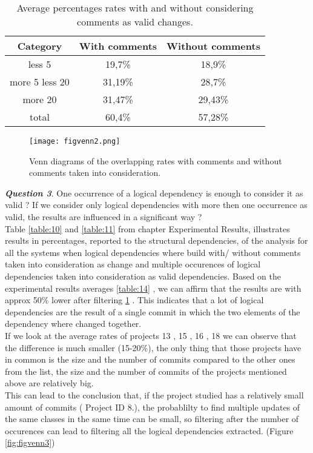 \begin{table}
  \centering
  \begin{tabular}{@{}c||cc@{}}
    \toprule
       Category & With comments & Without comments  \\
    \midrule
less 5	&	19,7\% &	18,9\%	\\
more 5 less 20	&	31,19\% &	28,7\%\\
more 20	&	31,47\%	&	29,43\%\\
total & 60,4\% &57,28\% \\
    \bottomrule
  \end{tabular}
  \caption{Average percentages rates with and without considering comments as valid changes.}
   \label{table:comm}
\end{table}

\begin{figure}[h]
\centering
\texttt{[image: figvenn2.png]}
\caption{Venn diagrams of the overlapping rates with comments and without comments taken into consideration.}
\label{fig:figvenn2}
\end{figure}



\textit{\textbf{Question 3}}. One occurrence of a logical dependency is enough to consider it as valid ? If we consider only logical dependencies with more then one occurrence as valid, the results are influenced in a significant way ?\\

\tab Table \ref{table:10} and \ref{table:11} from chapter Experimental Results,  illustrates results in percentages, reported to the structural dependencies, of the analysis for all the systems when logical dependencies where build with/ without comments taken into consideration as change and multiple occurences of logical dependencies taken into consideration as valid dependencies. Based on the experimental results averages \ref{table:14} , we can affirm that the results are with approx 50\% lower after filtering \ref{table:comm} . This indicates that a lot of logical dependencies are the result of a single commit in which the two elements of the dependency where changed together. \\ If we look at the average rates of projects 13 , 15 , 16 , 18 we can observe that the difference is much smaller (15-20\%), the only thing that those projects have in common is the size and the number of commits compared to the other ones from the list, the size and the number of commits of the projects mentioned above are relatively big. \\ This can lead to the conclusion that, if the project studied has a relatively small amount of commits ( Project ID 8.), the probablilty to find multiple updates of the same classes in the same time can be small, so filtering after the number of occurences can lead to filtering all the logical dependencies extracted. (Figure \ref{fig:figvenn3})

